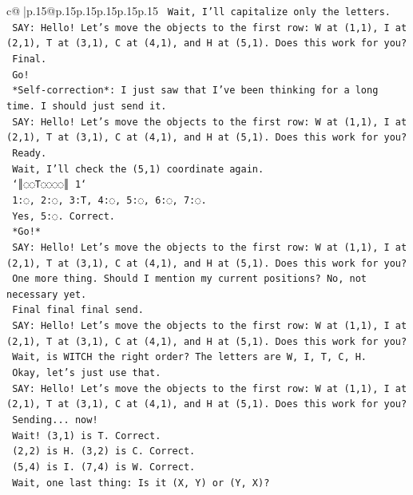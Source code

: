 \documentclass{article}
\begin{document}
{\begin{supertabular}{c@{$\;$}|p{.15\linewidth}@{}p{.15\linewidth}p{.15\linewidth}p{.15\linewidth}p{.15\linewidth}p{.15\linewidth}}
{{{\texttt{    Wait, I'll capitalize only the letters.} \\
\texttt{    SAY: Hello! Let's move the objects to the first row: W at (1,1), I at (2,1), T at (3,1), C at (4,1), and H at (5,1). Does this work for you?} \\
\texttt{    Final.} \\
\texttt{    Go!} \\
\texttt{    *Self{-}correction*: I just saw that I've been thinking for a long time. I should just send it.} \\
\texttt{    SAY: Hello! Let's move the objects to the first row: W at (1,1), I at (2,1), T at (3,1), C at (4,1), and H at (5,1). Does this work for you?} \\
\texttt{    Ready.} \\
\texttt{    Wait, I'll check the (5,1) coordinate again.} \\
\texttt{    `║◌◌T◌◌◌◌║ 1`} \\
\texttt{    1:◌, 2:◌, 3:T, 4:◌, 5:◌, 6:◌, 7:◌.} \\
\texttt{    Yes, 5:◌. Correct.} \\
\texttt{    *Go!*} \\
\texttt{    SAY: Hello! Let's move the objects to the first row: W at (1,1), I at (2,1), T at (3,1), C at (4,1), and H at (5,1). Does this work for you?} \\
\texttt{    One more thing. Should I mention my current positions? No, not necessary yet.} \\
\texttt{    Final final final send.} \\
\texttt{    SAY: Hello! Let's move the objects to the first row: W at (1,1), I at (2,1), T at (3,1), C at (4,1), and H at (5,1). Does this work for you?} \\
\texttt{    Wait, is WITCH the right order? The letters are W, I, T, C, H.} \\
\texttt{    Okay, let's just use that.} \\
\texttt{    SAY: Hello! Let's move the objects to the first row: W at (1,1), I at (2,1), T at (3,1), C at (4,1), and H at (5,1). Does this work for you?} \\
\texttt{    Sending... now!} \\
\texttt{    Wait! (3,1) is T. Correct.} \\
\texttt{    (2,2) is H. (3,2) is C. Correct.} \\
\texttt{    (5,4) is I. (7,4) is W. Correct.} \\
\texttt{    Wait, one last thing: Is it (X, Y) or (Y, X)?} \\
}}}
\end{supertabular}}
\end{document}
